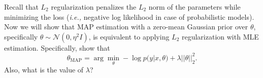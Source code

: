 \item  {} Recall that $L_2$ regularization penalizes the $L_2$ norm
of the parameters while minimizing the loss (\emph{i.e.,} negative log likelihood in case of
probabilistic models).
Now we will show that MAP estimation with a zero-mean
Gaussian prior over $\theta$, specifically $\theta \sim \mathcal{N}(0, \eta^2I)$,
is equivalent to applying $L_2$ regularization with MLE estimation. Specifically,
show that $$\theta_{\text{MAP}} = \arg\min_\theta - \log p(y|x,\theta) + \lambda||\theta||^2_2.$$
Also, what is the value of $\lambda$?


